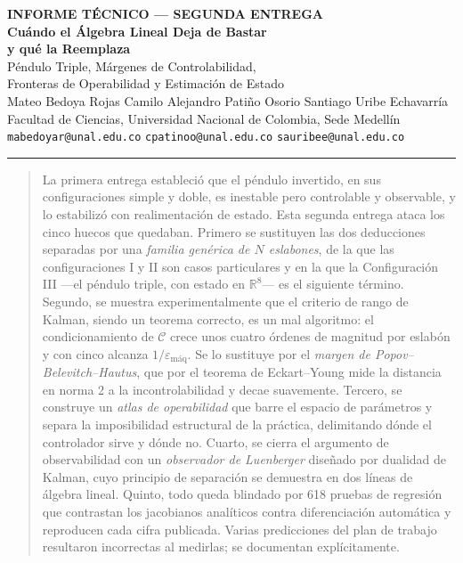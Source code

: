 \documentclass[11pt,letterpaper]{article}
\theoremstyle{definition}
\theoremstyle{plain}
\theoremstyle{remark}
\newcommand{\R}{\mathbb{R}}
\newcommand{\calC}{\mathcal{C}}
\begin{document}
\begin{center}
    {\footnotesize\bfseries\color{acento2} INFORME TÉCNICO --- SEGUNDA ENTREGA}\\[0.4em]
    {\LARGE\bfseries Cuándo el Álgebra Lineal Deja de Bastar \\[0.2em]
     y qué la Reemplaza}\\[0.5em]
    {\large Péndulo Triple, Márgenes de Controlabilidad, \\ Fronteras de Operabilidad y Estimación de Estado}\\[1.2em]
    {\normalsize Mateo Bedoya Rojas \quad\textbullet\quad Camilo Alejandro Patiño Osorio \quad\textbullet\quad Santiago Uribe Echavarría}\\[0.5em]
    {\footnotesize
    Facultad de Ciencias, Universidad Nacional de Colombia, Sede Medellín \\ \texttt{mabedoyar@unal.edu.co} \quad \texttt{cpatinoo@unal.edu.co} \quad \texttt{sauribee@unal.edu.co}}\\[0.8em]
\end{center}
\vspace{0.4em}
\hrule height 0.6pt
\vspace{1.0em}

\begin{abstract}
\noindent
La primera entrega estableció que el péndulo invertido, en sus configuraciones
simple y doble, es inestable pero controlable y observable, y lo estabilizó con
realimentación de estado. Esta segunda entrega ataca los cinco huecos que
quedaban. Primero se sustituyen las dos deducciones separadas por una
\emph{familia genérica de $N$ eslabones}, de la que las configuraciones I y II
son casos particulares y en la que la Configuración III ---el péndulo triple,
con estado en $\R^8$--- es el siguiente término. Segundo, se muestra
experimentalmente que el criterio de rango de Kalman, siendo un teorema
correcto, es un mal algoritmo: el condicionamiento de $\calC$ crece unos cuatro
órdenes de magnitud por eslabón y con cinco alcanza $1/\varepsilon_{\text{máq}}$.
Se lo sustituye por el \emph{margen de Popov--Belevitch--Hautus}, que por el
teorema de Eckart--Young mide la distancia en norma 2 a la incontrolabilidad y
decae suavemente. Tercero, se construye un \emph{atlas de operabilidad} que
barre el espacio de parámetros y separa la imposibilidad estructural de la
práctica, delimitando dónde el controlador sirve y dónde no. Cuarto, se cierra
el argumento de observabilidad con un \emph{observador de Luenberger} diseñado
por dualidad de Kalman, cuyo principio de separación se demuestra en dos líneas
de álgebra lineal. Quinto, todo queda blindado por 618 pruebas de regresión que
contrastan los jacobianos analíticos contra diferenciación automática y
reproducen cada cifra publicada. Varias predicciones del plan de trabajo
resultaron incorrectas al medirlas; se documentan explícitamente.
\end{abstract}
\end{document}
